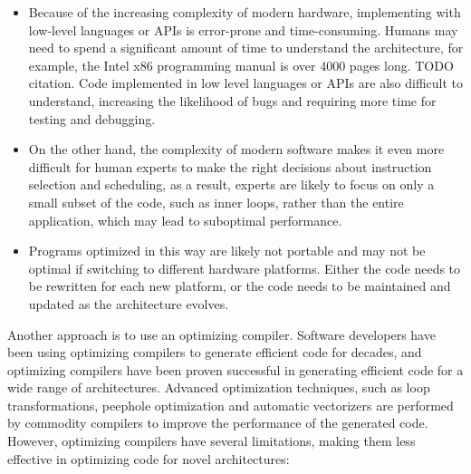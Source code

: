 \begin{itemize}
%
\item Because of the increasing complexity of modern hardware,
implementing with low-level languages or APIs is error-prone and
time-consuming. Humans may need to spend a significant amount of time
to understand the architecture, for example, the Intel x86 programming
manual is over 4000 pages long. TODO citation. Code implemented in low
level languages or APIs are also difficult to understand, increasing
the likelihood of bugs and requiring more time for testing and
debugging.

\item On the other hand, the complexity of modern software makes it even
more difficult for human experts to make the right decisions about
instruction selection and scheduling, as a result, experts are likely
to focus on only a small subset of the code, such as inner loops,
rather than the entire application, which may lead to suboptimal
performance.

\item Programs optimized in this way are likely not portable and
may not be optimal if switching to different hardware platforms.
%
Either the code needs to be rewritten for each new platform, or the
code needs to be maintained and updated as the architecture evolves.

\end{itemize}


Another approach is to use an optimizing compiler.
%
Software developers have been using optimizing compilers to generate
efficient code for decades, and optimizing compilers have been proven
successful in generating efficient code for a wide range of
architectures.
%
Advanced optimization techniques, such as loop transformations,
peephole optimization and automatic vectorizers are performed by
commodity compilers to improve the performance of the generated code.
%
However, optimizing compilers have several limitations, making them
less effective in optimizing code for novel architectures:

